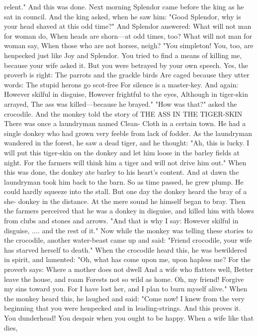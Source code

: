 \documentclass{book}
\begin{document}
relent." And this was done.
Next morning Splendor came before the king as
he sat in council. And the king asked, when he saw
him:  "Good Splendor, why is your head shaved at
this odd time?" And Splendor answered:
What will not man for woman do,
When heads are shorn---at odd times, too?
What will not man for woman say,
When those who are not horses, neigh?
"You simpleton! You, too, are henpecked just
like Joy and Splendor. You tried to find a means of
killing me, because your wife asked it. But you were
betrayed by your own speech. Yes, the proverb is
right:
The parrots and the grackle birds
Are caged because they utter words:
The stupid herons go scot-free
For silence is a master-key.
And again:
However skilful in disguise,
However frightful to the eyes,
Although in tiger-skin arrayed,
The ass was killed---because he brayed."
"How was that?" asked the crocodile. And the
monkey told the story of
THE ASS IN THE TIGER-SKIN
There was once a laundryman named Clean-
Cloth in a certain town. He had a single donkey who
had grown very feeble from lack of fodder.
As the laundryman wandered in the forest, he
saw a dead tiger, and he thought: "Ah, this is lucky.
I will put this tiger-skin on the donkey and let him
loose in the barley fields at night. For the farmers
will think him a tiger and will not drive him out."
When this was done, the donkey ate barley to his
heart's content. And at dawn the laundryman took
him back to the barn. So as time passed, he grew
plump. He could hardly squeeze into the stall.
But one day the donkey heard the bray of a she-
donkey in the distance. At the mere sound he himself
began to bray. Then the farmers perceived that he
was a donkey in disguise, and killed him with blows
from clubs and stones and arrows.
"And that is why I say:
However skilful in disguise, ....
and the rest of it."
Now while the monkey was telling these stories
to the crocodile, another water-beast came up and
said: "Friend crocodile, your wife has starved herself
to death."
When the crocodile heard this, he was bewildered
in spirit, and lamented: "Oh, what has come upon
me, upon hapless me? For the proverb says:
Where a mother does not dwell
And a wife who flatters well,
Better leave the house, and roam
Forests not so wild as home.
Oh, my friend! Forgive my sins toward you. For I
have lost her, and I plan to burn myself alive."
When the monkey heard this, he laughed and
said: "Come now! I knew from the very beginning
that you were henpecked and in leading-strings. And
this proves it. You dunderhead! You despair when
you ought to be happy. When a wife like that dies,
\end{document}
